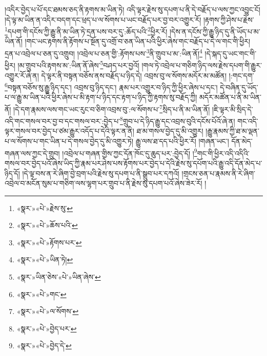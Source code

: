 །འདིར་བྱེད་པ་པོ་དང་ཐམས་ཅད་ནི་རྟགས་མ་ཡིན་ཏེ། འདི་ལྟར་རྗེས་སུ་དཔག་པ་ནི་དེ་བརྗོད་པ་ལས་ཀྱང་འབྱུང་ངོ། །དེ་ལྟ་མ་ཡིན་ན་འདིར་བདག་དང་ཕྲད་པ་ལ་སོགས་པ་ཡང་བརྗོད་པར་བྱ་བར་འགྱུར་རོ། །རྟགས་ཀྱི་ཤེས་པ་རྗེས་\footnote{«སྣར་»«པེ་»རྗེས་སུ་}དཔག་གི་དངོས་ཀྱི་རྒྱུ་ནི་མ་ཡིན་ཏེ་དྲན་པས་བར་དུ་:ཆོད་པའི་\footnote{«སྣར་»«པེ་»ཆོས་པའི་}ཕྱིར་རོ། །དེས་ན་དངོས་ཀྱི་རྒྱུ་ཉིད་དུ་ནི་ཡོད་པ་མ་ཡིན་ནོ། །གང་ཡང་རྟགས་ནི་རྟོགས་པ་སྔོན་དུ་འགྲོ་བ་ཅན་ཡིན་པའི་ཕྱིར་ཞེས་གང་བརྗོད་པ་དེ་ལ་གང་གི་ཕྱིར། དྲན་པ་འབྲེལ་པ་ཅན་དུ་འགྲུབ། །འབྲེལ་པ་ཅན་གྱི་:རྟོགས་པས་\footnote{«སྣར་»«པེ་»རྟོགས་པར་}ནི་གྲུབ་པ་མ་:ཡིན་ནོ།\footnote{«སྣར་»«པེ་»ཡིན་ཏེ།} །དེ་སྐད་དུ་ཡང་གང་གི་ཕྱིར། །མ་གྲུབ་པའི་རྟགས་མ་:ཡིན་ནོ་ཞེས་\footnote{«སྣར་»ཡིན་ཅེས་«པེ་»ཡིན་ཞེས་}བཤད་པར་བྱའོ། །གལ་ཏེ་འབྲེལ་པ་གཅིག་ཉིད་ལས་རྗེས་དཔག་གི་རྒྱུར་འགྱུར་རོ་ཞེ་ན། དེ་ལྟར་ནི་བསྟན་བཅོས་ནས་བརྗོད་པ་ཉིད་དེ། འབྲས་བུ་ལ་སོགས་མདོར་མ་མཚོན། །:གང་དག་\footnote{«སྣར་»«པེ་»གང་}བསྟན་བཅོས་སུ་རྒྱུ་ཉིད་དང་། འབྲས་བུ་ཉིད་དང་། རྣམ་པར་འགྱུར་བ་ཉིད་ཀྱི་ཕྱིར་ཞེས་པ་དང་། དེ་བཞིན་དུ་ཡོད་པ་ལ་རྒྱུ་མ་ཡིན་པའི་ཕྱིར་ཞེས་པ་མི་རྟག་པ་ཉིད་དང་རྟག་པ་ཉིད་ཀྱི་རྟགས་སུ་བརྗོད་ཀྱི། མདོར་མཚོན་པ་ནི་མ་ཡིན་ནོ། །དེ་དག་རྣམས་ལས་གང་ཡང་རུང་བ་ཅིག་འབྲས་བུ་:ལ་སོགས་པ་\footnote{«སྣར་»«པེ་»ལ་སོགས་}སྲིད་པ་ནི་མ་ཡིན་ནོ། །ཇི་ལྟར་མི་སྲིད་དེ་འདི་གང་གསལ་བར་བྱ་བ་དང་གསལ་བར་:བྱེད་པ་\footnote{«སྣར་»«པེ་»བྱེད་པར་}གྲུབ་པ་དེ་ཉིད་རྒྱུ་དང་འབྲས་བུའི་དངོས་པོའོ་ཞེ་ན། གང་འདི་ལྟར་གསལ་བར་བྱེད་པ་ཙམ་རྒྱུར་འདོད་པ་དེའི་ལྟར་ན་ནི། ཐ་མ་གསལ་བྱེད་དུ་མི་འགྱུར། །རྒྱུ་རྣམས་ཀྱི་ཐ་མ་ལྡན་པ་ལ་སོགས་པ་གང་ཡིན་པ་དེ་གསལ་བྱེད་དུ་མི་འགྱུར་ཏེ། རྒྱུ་ལས་ཐ་དད་པའི་ཕྱིར་རོ། །གཞན་ཡང་། དོན་མེད་གཞན་ལས་ཀྱང་དེ་གྲུབ། །འབྲེལ་པ་གཞན་གྱིས་ཀྱང་དོན་ཁོང་དུ་ཆུད་པར་:བྱེད་དོ། །\footnote{«སྣར་»«པེ་»བྱེད་དེ་}གང་གི་ཕྱིར་འདི་འདིའི་གསལ་བར་བྱེད་པའོ་ཞེས་ཡིད་ཀྱི་རྣམ་པར་ཤེས་པས་རྟོགས་པར་བྱེད་པ་དེའི་རྗེས་སུ་དཔོག་པའི་རྒྱུ་འདི་དོན་མེད་པ་ཉིད་དོ། །དེ་ལྟ་བས་ན་རེ་ཞིག་བྱེ་བྲག་པའི་རྗེས་སུ་དཔག་པ་ནི་སྒྲུབ་པར་དཀའོ། །གྲངས་ཅན་པ་རྣམས་ནི་རེ་ཞིག་འབྲེལ་བ་མངོན་སུམ་པ་གཅིག་ལས་ལྷག་པར་གྲུབ་པ་ནི་རྗེས་སུ་དཔག་པའོ་ཞེས་ཟེར་རོ། །
